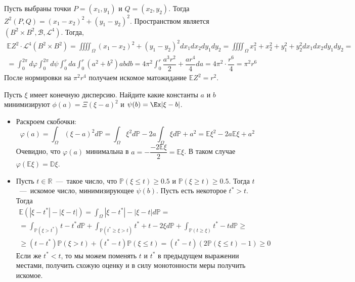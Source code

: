 \begin{solution}
    Пусть выбраны точки $P = (x_1, y_1)$ и $Q = (x_2, y_2)$. Тогда $Z^2(P, Q) = (x_1 - x_2)^2 + (y_1 - y_2)^2$. Пространством является $(B^2\times B^2, \mathcal{B}, \mathcal{L}^4)$. Тогда,
    \begin{multline*}
        \mathbb{E}Z^2\cdot \mathcal{L}^4(B^2 \times B^2) = \iiiint_\Omega (x_1 - x_2)^2 + (y_1 - y_2)^2dx_1dx_2dy_1dy_2 = \iiiint_\Omega x_1^2 + x_2^2 + y_1^2 +y_2^2dx_1dx_2dy_1dy_2 = \\ =  \int_0^{2\pi}d\varphi\int_0^{2\pi}d\psi\int_0^rda\int_0^r (a^2 + b^2)abdb = 4\pi^2 \int_0^r \dfrac{a^3r^2}{2} + \dfrac{ar^4}{4}da = 4\pi^2\cdot \dfrac{r^6}{4} = \pi^2r^6
    \end{multline*}
    После нормировки на $\pi^2 r^4$ получаем искомое матожидание $\mathbb{E}Z^2 = r^2$.
\end{solution}
\begin{problem}
    Пусть $\xi$ имеет конечную дисперсию.
    Найдите какие константы $a$ и $b$ минимизируют $\phi(a) = \Xi (\xi - a)^2$ и $\psi(b) = \Ex |\xi - b|$.
\end{problem}
\begin{solution}
    \begin{itemize} \leavevmode
    \item Раскроем скобочки: \[\varphi(a) = \int_\Omega(\xi - a)^2d\mathbb{P} = \int_\Omega\xi^2d\mathbb{P} - 2a\int_\Omega\xi d\mathbb{\mathbb{P}} + a^2  = \mathbb{E}\xi^2 - 2a\mathbb{E}\xi + a^2\]
    Очевидно, что $\varphi(a)$ минимальна в $a = -\dfrac{-2\mathbb{E}\xi}{2} = \mathbb{E}\xi$. В таком случае $\varphi(\mathbb{E}\xi) = \mathbb{D}\xi$.
    \item Пусть $t \in \mathbb{R}$~---~такое число, что $\mathbb{P}(\xi \leq t) \geq 0.5$ и $\mathbb{P}(\xi \geq t) \geq 0.5$. Тогда $t$~---~искомое число, минимизирующее $\psi(b)$. Пусть есть некоторое $t^* > t$. Тогда \begin{multline*}
                                                                                                                                                                                                                                \mathbb{E}(|\xi - t^*| - |\xi - t|) = \int_\Omega |\xi - t^*| - |\xi - t|d\mathbb{P} = \\ = \int_{\mathbb{P}(\xi > t^*)} t - t^*d\mathbb{P} + \int_{\mathbb{P}(t^* \geq \xi > t )}t^* + t - 2\xi d\mathbb{P} + \int_{\mathbb{P}(t \geq \xi)} t^* - td\mathbb{P} \geq \\ \geq (t - t^*)\mathbb{P}(\xi > t) + (t^* - t)\mathbb{P}(\xi \leq t)  = (t^* - t)(2\mathbb{P}(\xi \leq t) - 1) \geq 0
    \end{multline*}
    Если же $t^* < t$, то мы можем поменять $t$ и $t^*$ в предыдущем выражении местами, получить схожую оценку и в силу монотонности меры получить искомое.
    \end{itemize}
\end{solution}